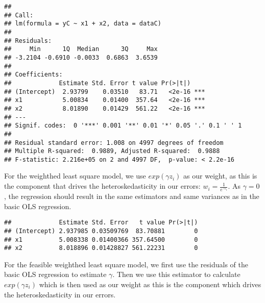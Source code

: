 \documentclass[
]{article}
\newenvironment{Shaded}{\begin{snugshade}}{\end{snugshade}}
\newcommand{\AttributeTok}[1]{\textcolor[rgb]{0.77,0.63,0.00}{#1}}
\newcommand{\CommentTok}[1]{\textcolor[rgb]{0.56,0.35,0.01}{\textit{#1}}}
\newcommand{\DecValTok}[1]{\textcolor[rgb]{0.00,0.00,0.81}{#1}}
\newcommand{\FunctionTok}[1]{\textcolor[rgb]{0.00,0.00,0.00}{#1}}
\newcommand{\NormalTok}[1]{#1}
\newcommand{\OtherTok}[1]{\textcolor[rgb]{0.56,0.35,0.01}{#1}}
\newcommand{\SpecialCharTok}[1]{\textcolor[rgb]{0.00,0.00,0.00}{#1}}
\begin{document}
\begin{verbatim}
## 
## Call:
## lm(formula = yC ~ x1 + x2, data = dataC)
## 
## Residuals:
##     Min      1Q  Median      3Q     Max 
## -3.2104 -0.6910 -0.0033  0.6863  3.6539 
## 
## Coefficients:
##             Estimate Std. Error t value Pr(>|t|)    
## (Intercept)  2.93799    0.03510   83.71   <2e-16 ***
## x1           5.00834    0.01400  357.64   <2e-16 ***
## x2           8.01890    0.01429  561.22   <2e-16 ***
## ---
## Signif. codes:  0 '***' 0.001 '**' 0.01 '*' 0.05 '.' 0.1 ' ' 1
## 
## Residual standard error: 1.008 on 4997 degrees of freedom
## Multiple R-squared:  0.9889, Adjusted R-squared:  0.9888 
## F-statistic: 2.216e+05 on 2 and 4997 DF,  p-value: < 2.2e-16
\end{verbatim}

For the weighthed least square model, we use \(exp(\gamma z_i)\) as our
weight, as this is the component that drives the heteroskedasticity in
our errors: \(w_i = \frac{1}{e^{\gamma z_i}}\). As \(\gamma = 0\), the
regression should result in the same estimators and same variances as in
the basic OLS regression.

\begin{Shaded}
\end{Shaded}

\begin{verbatim}
##             Estimate Std. Error   t value Pr(>|t|)
## (Intercept) 2.937985 0.03509769  83.70881        0
## x1          5.008338 0.01400366 357.64500        0
## x2          8.018896 0.01428827 561.22231        0
\end{verbatim}

For the feasible weighthed least square model, we first use the
residuals of the basic OLS regression to estimate \(\gamma\). Then we
use this estimator to calculate \(exp(\gamma z_i)\) which is then used
as our weight as this is the component which drives the
heteroskedasticity in our errors.
\end{document}
